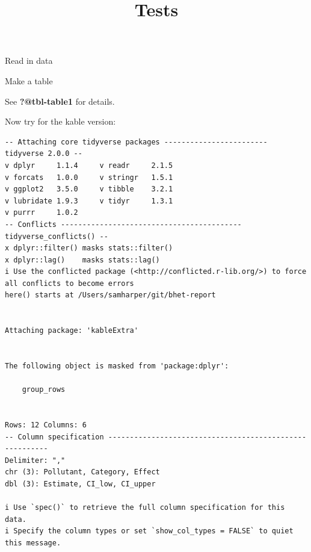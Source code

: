 \documentclass[
  letterpaper,
  DIV=11,
  numbers=noendperiod]{scrartcl}
\title{Tests}
\author{}
\date{}
\begin{document}
\maketitle
\ifdefined\Shaded\renewenvironment{Shaded}{\begin{tcolorbox}[interior hidden, enhanced, breakable, boxrule=0pt, sharp corners, frame hidden, borderline west={3pt}{0pt}{shadecolor}]}{\end{tcolorbox}}\fi

Read in data

Make a table

\begin{table}

\end{table}

See \textbf{?@tbl-table1} for details.

Now try for the kable version:

\begin{table}

\end{table}

\begin{verbatim}
-- Attaching core tidyverse packages ------------------------ tidyverse 2.0.0 --
v dplyr     1.1.4     v readr     2.1.5
v forcats   1.0.0     v stringr   1.5.1
v ggplot2   3.5.0     v tibble    3.2.1
v lubridate 1.9.3     v tidyr     1.3.1
v purrr     1.0.2     
-- Conflicts ------------------------------------------ tidyverse_conflicts() --
x dplyr::filter() masks stats::filter()
x dplyr::lag()    masks stats::lag()
i Use the conflicted package (<http://conflicted.r-lib.org/>) to force all conflicts to become errors
here() starts at /Users/samharper/git/bhet-report


Attaching package: 'kableExtra'


The following object is masked from 'package:dplyr':

    group_rows


Rows: 12 Columns: 6
-- Column specification --------------------------------------------------------
Delimiter: ","
chr (3): Pollutant, Category, Effect
dbl (3): Estimate, CI_low, CI_upper

i Use `spec()` to retrieve the full column specification for this data.
i Specify the column types or set `show_col_types = FALSE` to quiet this message.
\end{verbatim}
\end{document}
